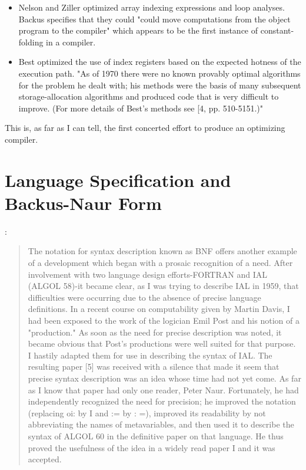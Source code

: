 \begin{itemize}
  \item Nelson and Ziller optimized array indexing expressions and
    loop analyses.
    Backus specifies that they could "could move computations from the object
    program to the compiler" which appears to be the first instance of
    constant-folding in a compiler.
  \item Best optimized the use of index registers based on the
    expected hotness of the
    execution path. "As of 1970 there were no known provably optimal
    algorithms for
    the problem he dealt with; his methods were the basis of many subsequent
    storage-allocation algorithms and produced code that is very difficult to
    improve. (For more details of Best's methods see [4, pp. 510-5151.)"
  \end{itemize}

  This is, as far as I can tell, the first concerted effort to produce an
  optimizing compiler.

  \section{Language Specification and Backus-Naur Form}

  \cite{Backus_1980_Programming_in_America_in_1950s}:
  \begin{quotation}
    The notation for syntax description known as BNF offers another example of a
    development which began with a prosaic recognition of a need.
    After involvement
    with two language design efforts-FORTRAN and IAL (ALGOL 58)-it
    became clear, as
    I was trying to describe IAL in 1959, that difficulties were
    occurring due to
    the absence of precise language definitions. In a recent course on
    computability given by Martin Davis, I had been exposed to the work of the
    logician Emil Post and his notion of a "production." As soon as the need for
    precise description was noted, it became obvious that Post's
    productions were
    well suited for that purpose. I hastily adapted them for use in
    describing the
    syntax of IAL. The resulting paper [5] was received with a
    silence that made it
    seem that precise syntax description was an idea whose time had
    not yet come.
    As far as I know that paper had only one reader, Peter Naur. Fortunately, he
    had independently recognized the need for precision; he improved
    the notation
    (replacing oi: by I and := by : =), improved its readability by not
    abbreviating the names of metavariables, and then used it to describe the
    syntax of ALGOL 60 in the definitive paper on that language. He
    thus proved the
    usefulness of the idea in a widely read paper I and it was accepted.
  \end{quotation}


